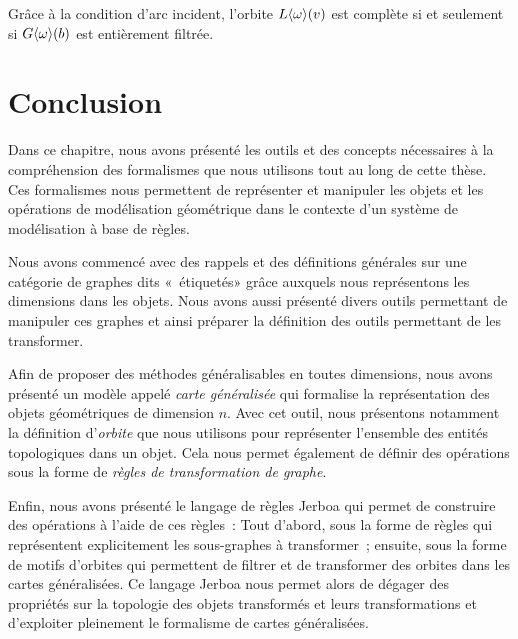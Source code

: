 \begin{remarque}
	Grâce à la condition d'arc incident, l'orbite $L\langle\omega\rangle(v)$ est complète si
	et seulement si $G\langle\omega\rangle(b)$ est entièrement filtrée. %
\end{remarque}



\section{Conclusion}
\label{sec:formalisation-modelisation-base-regles-conclusion}



Dans ce chapitre, nous avons présenté les outils et des concepts nécessaires à
la compréhension des formalismes que nous utilisons tout au long de cette
thèse. %
Ces formalismes nous permettent de représenter et manipuler les objets et les
opérations de modélisation géométrique dans le contexte d'un système de
modélisation à base de règles. %

Nous avons commencé avec des rappels et des définitions générales sur une
catégorie de graphes dits «~étiquetés» grâce auxquels nous représentons les
dimensions dans les objets. %
Nous avons aussi présenté divers outils permettant de manipuler ces graphes et
ainsi préparer la définition des outils permettant de les transformer. %


Afin de proposer des méthodes généralisables en toutes dimensions, nous avons
présenté un modèle appelé \emph{carte généralisée} qui formalise la
représentation des objets géométriques de dimension \(n\). %
Avec cet outil, nous présentons notamment la définition d'\emph{orbite} que nous
utilisons pour représenter l'ensemble des entités topologiques dans un objet. %
Cela nous permet également de définir des opérations sous la forme de
\emph{règles de transformation de graphe}. %


Enfin, nous avons présenté le langage de règles Jerboa qui permet de construire
des opérations à l'aide de ces règles~: %
Tout d'abord, sous la forme de règles qui représentent explicitement les
sous-graphes à transformer~; %
ensuite, sous la forme de motifs d'orbites qui permettent de filtrer et de
transformer des orbites dans les cartes généralisées. %
Ce langage Jerboa nous permet alors de dégager des propriétés sur la topologie
des objets transformés et leurs transformations et d'exploiter pleinement le
formalisme de cartes généralisées. %

